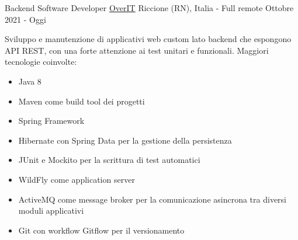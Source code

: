 

\begin{cventries}

\cventry
	{Backend Software Developer} %
	{\href{https://overit.it/}{OverIT}} %
	{Riccione (RN), Italia - Full remote} %
	{Ottobre 2021 - Oggi} %
	{
		Sviluppo e manutenzione di applicativi web custom lato backend che espongono API REST, con una forte attenzione ai test unitari e funzionali.
		Maggiori tecnologie coinvolte:
		\begin{itemize}
			\item {Java 8}
			\item {Maven come build tool dei progetti}
			\item {Spring Framework}
			\item {Hibernate con Spring Data per la gestione della persistenza}
			\item {JUnit e Mockito per la scrittura di test automatici}
			\item {WildFly come application server}
			\item {ActiveMQ come message broker per la comunicazione asincrona tra diversi moduli applicativi}
			\item {Git con workflow Gitflow per il versionamento}
		\end{itemize}
	}



\end{cventries}
